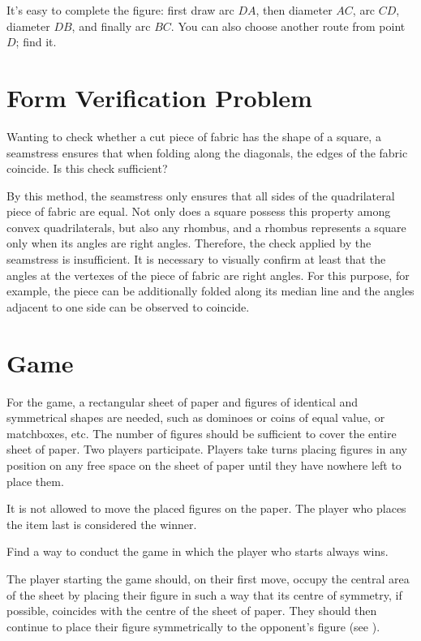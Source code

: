 It's easy to complete the figure: first draw arc $DA$, then diameter $AC$, arc $CD$, diameter $DB$, and finally arc $BC$. You can also choose another route from point $D$; find it.


\section{Form Verification Problem}
\label{sec-10.12}

\ques Wanting to check whether a cut piece of fabric has the shape of a square, a seamstress ensures that when folding along the diagonals, the edges of the fabric coincide. Is this check sufficient?

\ans By this method, the seamstress only ensures that all sides of the quadrilateral piece of fabric are equal. Not only does a square possess this property among convex quadrilaterals, but also any rhombus, and a rhombus represents a square only when its angles are right angles. Therefore, the check applied by the seamstress is insufficient. It is necessary to visually confirm at least that the angles at the vertexes of the piece of fabric are right angles. For this purpose, for example, the piece can be additionally folded along its median line and the angles adjacent to one side can be observed to coincide.

\section{Game}
\label{sec-10.13}

For the game, a rectangular sheet of paper and figures of identical and symmetrical shapes are needed, such as dominoes or coins of equal value, or matchboxes, etc. The number of figures should be sufficient to cover the entire sheet of paper. Two players participate. Players take turns placing figures in any position on any free space on the sheet of paper until they have nowhere left to place them.

It is not allowed to move the placed figures on the paper. The player who places the item last is considered the winner.



\ques Find a way to conduct the game in which the player who starts always wins.



\ans The player starting the game should, on their first move, occupy the central area of the sheet by placing their figure in such a way that its centre of symmetry, if possible, coincides with the centre of the sheet of paper. They should then continue to place their figure symmetrically to the opponent's figure (see ).



